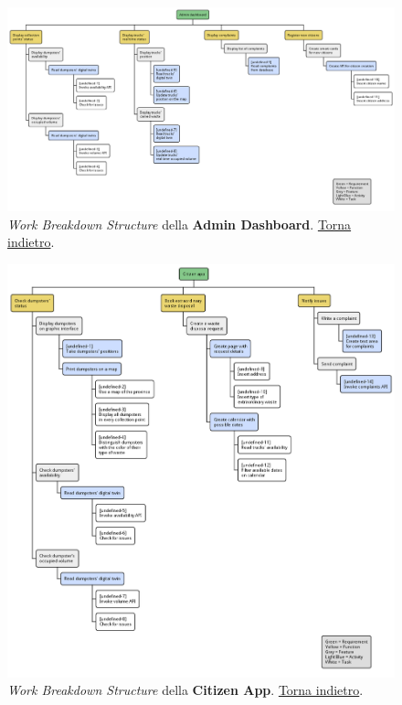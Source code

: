 \begin{figure}[H]
    \centering
    \includegraphics[width=\textwidth]{img/wbs-admin-dashboard.pm}
    \caption{\textit{Work Breakdown Structure} della \textbf{Admin Dashboard}. \hyperlink{back:wbs-admin-dashboard}{Torna indietro}.}
    \label{fig:wbs-admin-dashboard}
\end{figure}

\begin{figure}[H]
    \centering
    \includegraphics[width=\textwidth]{img/wbs-citizen-app.pm}
    \caption{\textit{Work Breakdown Structure} della \textbf{Citizen App}. \hyperlink{back:wbs-citizen-app}{Torna indietro}.}
    \label{fig:wbs-citizen-app}
\end{figure}

